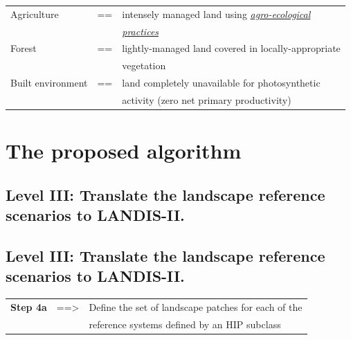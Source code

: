 \documentclass[
paper=128mm:96mm, %
fontsize=11pt, %
pagesize, %
parskip=half-, %
]{scrartcl} %
\theoremstyle{mythmstyle} %
\begin{document}
\begin{tabular}{lll}
  Agriculture & == &intensely managed land using \underline{\textit{agro-ecological}}\\
  & & \underline{\textit{practices}}\\
 Forest & == &lightly-managed land covered in locally-appropriate\\
 & & vegetation\\
 Built environment & == &land completely unavailable for photosynthetic\\
 & & activity (zero net primary productivity)
\end{tabular}

\clearpage
\section{The proposed algorithm}
\subsection{Level III: Translate the landscape reference scenarios to LANDIS-II.}
    
\clearpage
\subsection{Level III: Translate the landscape reference scenarios to LANDIS-II.}
\footnotesize 
\begin{tabular}{lll}
	\textbf{Step 4a} & ==> & Define the set of landscape patches for each of the\\
	& & reference systems defined by an HIP subclass\\
\end{tabular}
\end{document}
